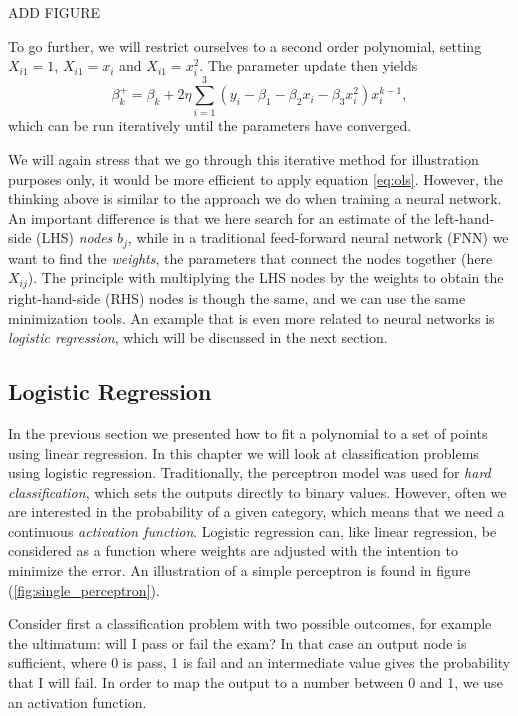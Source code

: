 ADD FIGURE

To go further, we will restrict  ourselves to a second order polynomial, setting $X_{i1}=1$, $X_{i1}=x_i$ and $X_{i1}=x_i^2$. The parameter update then yields
\begin{equation}
\beta_k^+=\beta_k+2\eta\sum_{i=1}^3(y_i-\beta_1-\beta_2x_i-\beta_3x_i^2)x_i^{k-1},
\end{equation}
which can be run iteratively until the parameters have converged. 

We will again stress that we go through this iterative method for illustration purposes only, it would be more efficient to apply equation \eqref{eq:ols}. However, the thinking above is similar to the approach we do when training a neural network. An important difference is that we here search for an estimate of the left-hand-side (LHS) \textit{nodes} $b_j$, while in a traditional feed-forward neural network (FNN) we want to find the \textit{weights}, the parameters that connect the nodes together (here $X_{ij}$). The principle with multiplying the LHS nodes by the weights to obtain the right-hand-side (RHS) nodes is though the same, and we can use the same minimization tools. An example that is even more related to neural networks is \textit{logistic regression}, which will be discussed in the next section. 

\subsection{Logistic Regression}
In the previous section we presented how to fit a polynomial to a set of points using linear regression. In this chapter we will look at classification problems using logistic regression. Traditionally, the perceptron model was used for \textit{hard classification}, which sets the outputs directly to binary values. However, often we are interested in the probability of a given category, which means that we need a continuous \textit{activation function}. Logistic regression can, like linear regression, be considered as a function where weights are adjusted with the intention to minimize the error. An illustration of a simple perceptron is found in figure (\ref{fig:single_perceptron}).



Consider first a classification problem with two possible outcomes, for example the ultimatum: will I pass or fail the exam? In that case an output node is sufficient, where 0 is pass, 1 is fail and an intermediate value gives the probability that I will fail. In order to map the output to a number between 0 and 1, we use an activation function.

